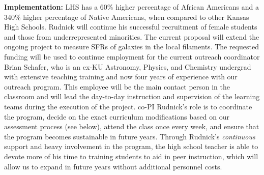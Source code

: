\documentclass[11pt, preprint]{aastex}
\begin{document}
{\noindent \textbf{Implementation:} LHS has a 60\% higher percentage of
African Americans and a 340\% higher percentage of Native Americans,
when compared to other Kansas High Schools. Rudnick will continue his
successful recruitment of female students and those from
underrepresented minorities. The current proposal will extend the
ongoing project to measure SFRs of galaxies in the local filaments.
The requested funding will be used to continue employment for the current outreach coordinator Brian Schafer, who is an ex-KU Astronomy, Physics, and Chemistry undergrad with extensive teaching training and now four years of experience with our outreach program.  This employee will be the main contact person in the
classroom and will lead the day-to-day instruction and supervision of
the learning teams during the execution of the project. co-PI Rudnick's role is to coordinate the program, decide on the exact
curriculum modifications based on our assessment process (see below), attend the
class once every week, and ensure that the program becomes sustainable
in future years. Through Rudnick's \textit{continuous} support and
heavy involvement in the program, the high school teacher is able to devote more of his time to training students to aid in peer instruction, which will allow us to expand in future years without additional personnel costs.


}
\end{document}
